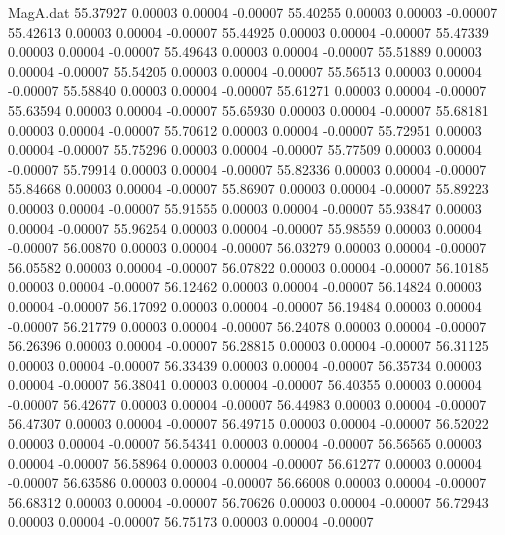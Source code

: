 \begin{filecontents}{MagA.dat}
  55.37927    0.00003    0.00004   -0.00007
  55.40255    0.00003    0.00003   -0.00007
  55.42613    0.00003    0.00004   -0.00007
  55.44925    0.00003    0.00004   -0.00007
  55.47339    0.00003    0.00004   -0.00007
  55.49643    0.00003    0.00004   -0.00007
  55.51889    0.00003    0.00004   -0.00007
  55.54205    0.00003    0.00004   -0.00007
  55.56513    0.00003    0.00004   -0.00007
  55.58840    0.00003    0.00004   -0.00007
  55.61271    0.00003    0.00004   -0.00007
  55.63594    0.00003    0.00004   -0.00007
  55.65930    0.00003    0.00004   -0.00007
  55.68181    0.00003    0.00004   -0.00007
  55.70612    0.00003    0.00004   -0.00007
  55.72951    0.00003    0.00004   -0.00007
  55.75296    0.00003    0.00004   -0.00007
  55.77509    0.00003    0.00004   -0.00007
  55.79914    0.00003    0.00004   -0.00007
  55.82336    0.00003    0.00004   -0.00007
  55.84668    0.00003    0.00004   -0.00007
  55.86907    0.00003    0.00004   -0.00007
  55.89223    0.00003    0.00004   -0.00007
  55.91555    0.00003    0.00004   -0.00007
  55.93847    0.00003    0.00004   -0.00007
  55.96254    0.00003    0.00004   -0.00007
  55.98559    0.00003    0.00004   -0.00007
  56.00870    0.00003    0.00004   -0.00007
  56.03279    0.00003    0.00004   -0.00007
  56.05582    0.00003    0.00004   -0.00007
  56.07822    0.00003    0.00004   -0.00007
  56.10185    0.00003    0.00004   -0.00007
  56.12462    0.00003    0.00004   -0.00007
  56.14824    0.00003    0.00004   -0.00007
  56.17092    0.00003    0.00004   -0.00007
  56.19484    0.00003    0.00004   -0.00007
  56.21779    0.00003    0.00004   -0.00007
  56.24078    0.00003    0.00004   -0.00007
  56.26396    0.00003    0.00004   -0.00007
  56.28815    0.00003    0.00004   -0.00007
  56.31125    0.00003    0.00004   -0.00007
  56.33439    0.00003    0.00004   -0.00007
  56.35734    0.00003    0.00004   -0.00007
  56.38041    0.00003    0.00004   -0.00007
  56.40355    0.00003    0.00004   -0.00007
  56.42677    0.00003    0.00004   -0.00007
  56.44983    0.00003    0.00004   -0.00007
  56.47307    0.00003    0.00004   -0.00007
  56.49715    0.00003    0.00004   -0.00007
  56.52022    0.00003    0.00004   -0.00007
  56.54341    0.00003    0.00004   -0.00007
  56.56565    0.00003    0.00004   -0.00007
  56.58964    0.00003    0.00004   -0.00007
  56.61277    0.00003    0.00004   -0.00007
  56.63586    0.00003    0.00004   -0.00007
  56.66008    0.00003    0.00004   -0.00007
  56.68312    0.00003    0.00004   -0.00007
  56.70626    0.00003    0.00004   -0.00007
  56.72943    0.00003    0.00004   -0.00007
  56.75173    0.00003    0.00004   -0.00007

\end{filecontents}
